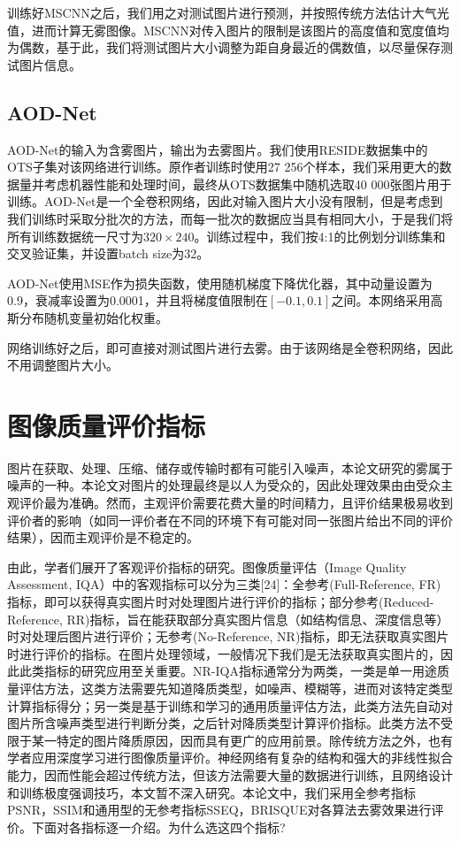 \documentclass[a4paper, 12pt, oneside]{report}
\begin{document}
{训练好MSCNN之后，我们用之对测试图片进行预测，并按照传统方法估计大气光值，进而计算无雾图像。MSCNN对传入图片的限制是该图片的高度值和宽度值均为偶数，基于此，我们将测试图片大小调整为距自身最近的偶数值，以尽量保存测试图片信息。

\subsection{AOD-Net\quad}
AOD-Net的输入为含雾图片，输出为去雾图片。我们使用RESIDE数据集中的OTS子集对该网络进行训练。原作者训练时使用27 256个样本，我们采用更大的数据量并考虑机器性能和处理时间，最终从OTS数据集中随机选取40 000张图片用于训练。AOD-Net是一个全卷积网络，因此对输入图片大小没有限制，但是考虑到我们训练时采取分批次的方法，而每一批次的数据应当具有相同大小，于是我们将所有训练数据统一尺寸为$320 \times 240$。训练过程中，我们按4:1的比例划分训练集和交叉验证集，并设置batch size为32。
	
AOD-Net使用MSE作为损失函数，使用随机梯度下降优化器，其中动量设置为0.9，衰减率设置为0.0001，并且将梯度值限制在$[-0.1, 0.1]$之间。本网络采用高斯分布随机变量初始化权重。
	
网络训练好之后，即可直接对测试图片进行去雾。由于该网络是全卷积网络，因此不用调整图片大小。

\section{图像质量评价指标\quad}
图片在获取、处理、压缩、储存或传输时都有可能引入噪声，本论文研究的雾属于噪声的一种。本论文对图片的处理最终是以人为受众的，因此处理效果由由受众主观评价最为准确。然而，主观评价需要花费大量的时间精力，且评价结果极易收到评价者的影响（如同一评价者在不同的环境下有可能对同一张图片给出不同的评价结果），因而主观评价是不稳定的。

由此，学者们展开了客观评价指标的研究。图像质量评估（Image Quality Assessment, IQA）中的客观指标可以分为三类[24]：全参考(Full-Reference, FR)指标，即可以获得真实图片时对处理图片进行评价的指标；部分参考(Reduced-Reference, RR)指标，旨在能获取部分真实图片信息（如结构信息、深度信息等）时对处理后图片进行评价；无参考(No-Reference, NR)指标，即无法获取真实图片时进行评价的指标。在图片处理领域，一般情况下我们是无法获取真实图片的，因此此类指标的研究应用至关重要。NR-IQA指标通常分为两类，一类是单一用途质量评估方法，这类方法需要先知道降质类型，如噪声、模糊等，进而对该特定类型计算指标得分；另一类是基于训练和学习的通用质量评估方法，此类方法先自动对图片所含噪声类型进行判断分类，之后针对降质类型计算评价指标。此类方法不受限于某一特定的图片降质原因，因而具有更广的应用前景。除传统方法之外，也有学者应用深度学习进行图像质量评价。神经网络有复杂的结构和强大的非线性拟合能力，因而性能会超过传统方法，但该方法需要大量的数据进行训练，且网络设计和训练极度强调技巧，本文暂不深入研究。本论文中，我们采用全参考指标PSNR，SSIM和通用型的无参考指标SSEQ，BRISQUE对各算法去雾效果进行评价。下面对各指标逐一介绍。{\Large 为什么选这四个指标?}



}
\end{document}
